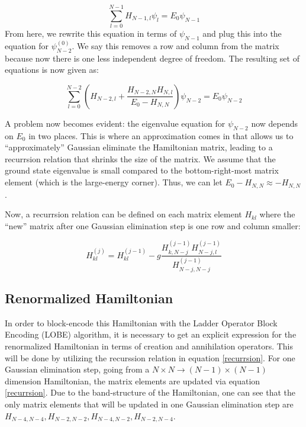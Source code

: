 \documentclass[%
 reprint,
nofootinbib,
 amsmath,amssymb,
 aps,
]{revtex4-2}
\numberwithin{equation}{section}
\begin{document}
\begin{equation}
  \sum_{l = 0}^{N - 1} H_{N - 1, l}\psi_l = E_0\psi_{N - 1}
\end{equation}
From here, we rewrite this equation in terms of $\psi_{N - 1}$ and plug this into the equation
for $\psi^{(0)}_{N - 2}$. We say this removes a row and column from the matrix because now
there is one less independent degree of freedom. The resulting set of equations is now given
as:

\begin{equation}
  \sum_{l = 0}^{N - 2}\left(H_{N-2, l} + \frac{H_{N-2, N}H_{N, l}}{E_0 - H_{N, N}} \right)\psi_{N - 2} = E_0\psi_{N - 2}
\end{equation}

A problem now becomes evident: the eigenvalue equation for $\psi_{N - 2}$ now depends on $E_0$ in two places.
This is where an approximation comes in that allows us to ``approximately'' Gaussian eliminate the
Hamiltonian matrix, leading to a recurrsion relation that shrinks the size of the matrix. We assume
that the ground state eigenvalue is small compared to the bottom-right-most matrix element (which 
is the large-energy corner). Thus, we can let $E_0 - H_{N, N} \approx -H_{N, N}$.

Now, a recurrsion relation can be defined on each matrix element $H_{kl}$ where the ``new'' matrix
after one Gaussian elimination step is one row and column smaller:

\begin{equation}
  \label{recurrsion}
  H_{kl}^{(j)} = H_{kl}^{(j - 1)} - g\frac{H_{k,N-j}^{(j - 1)}H_{N-j,l}^{(j - 1)}}{H_{N-j,N-j}^{(j - 1)}}
\end{equation}

\subsection{Renormalized Hamiltonian}
In order to block-encode this Hamiltonian with the Ladder Operator Block Encoding (LOBE) algorithm, it is necessary to get an explicit expression for the renormalized Hamiltonian in terms of creation and annihilation operators. 
This will be done by utilizing the recurssion relation in equation \ref{recurrsion}. For one Gaussian elimination step, going from a $N \times N \rightarrow (N - 1)\times (N - 1)$ dimension Hamiltonian, the matrix elements are updated via equation \ref{recurrsion}. Due to the band-structure of the Hamiltonian, one can see that the only matrix elements that will be updated in one Gaussian elimination step are $H_{N-4, N-4}, H_{N-2, N-2}, H_{N-4, N-2}, H_{N-2, N-4}$. 
\end{document}
